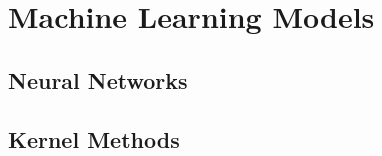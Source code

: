 \chapter{Machine Learning Models} %

\label{Chapter3} %
\setcounter{chapter}{3}
\section{Neural Networks}
\section{Kernel Methods}
